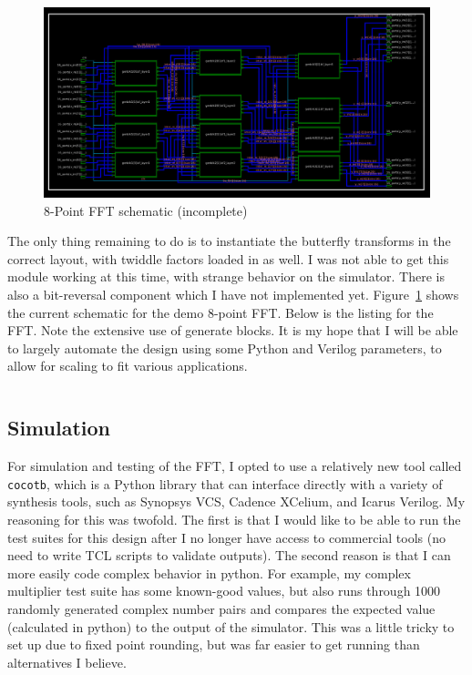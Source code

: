 \documentclass[12pt]{article}
\begin{document}
\begin{figure}[h]
	\includegraphics[width=\textwidth]{fft_schematic.png}
	\caption{8-Point FFT schematic (incomplete)}
	\label{fig:fft_schem}
\end{figure}
The only thing remaining to do is to instantiate the butterfly transforms
in the correct layout, with twiddle factors loaded in as well. I was not able
to get this module working at this time, with strange behavior on the
simulator. There is also a bit-reversal component which I have not implemented
yet. Figure~\ref{fig:fft_schem} shows the current schematic for the demo
8-point FFT. Below is the listing for the FFT. Note the extensive use of
generate blocks. It is my hope that I will be able to largely automate
the design using some Python and Verilog parameters, to allow for
scaling to fit various applications.

	\inputminted[frame=lines]{verilog}{../rtl/fft.v}

\subsection{Simulation}

For simulation and testing of the FFT, I opted to use a relatively new tool
called \texttt{cocotb}\cite{cocotb}, which is a Python library that can interface directly
with a variety of synthesis tools, such as Synopsys VCS, Cadence XCelium, and
Icarus Verilog. My reasoning for this was twofold. The first is that I would
like to be able to run the test suites for this design after I no longer have
access to commercial tools (no need to write TCL scripts to validate outputs).
The second reason is that I can more easily code complex behavior in python.
For example, my complex multiplier test suite has some known-good values, but
also runs through 1000 randomly generated complex number pairs and compares the
expected value (calculated in python) to the output of the simulator. This
was a little tricky to set up due to fixed point rounding, but was far easier
to get running than alternatives I believe.
\end{document}
